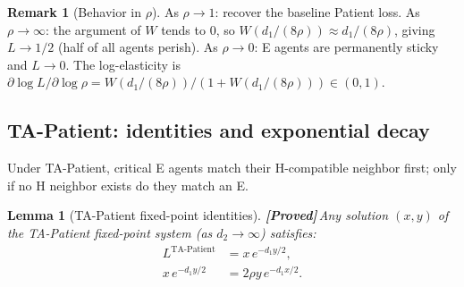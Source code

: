 \documentclass{article}
\theoremstyle{plain}
\newtheorem{lemma}{Lemma}
\theoremstyle{definition}
\newtheorem{remark}{Remark}
\newcommand{\proved}{\textcolor{provedgreen}{\textbf{[Proved]}}\,}
\begin{document}
\begin{remark}[Behavior in $\rho$]
As $\rho\to 1$: recover the baseline Patient loss.
As $\rho\to\infty$: the argument of $W$ tends to 0, so
$W(d_1/(8\rho))\approx d_1/(8\rho)$, giving $L\to 1/2$ (half of all agents
perish).
As $\rho\to 0$: E agents are permanently sticky and $L\to 0$.
The log-elasticity is
$\partial\log L/\partial\log\rho = W(d_1/(8\rho))/(1+W(d_1/(8\rho)))\in(0,1)$.
\end{remark}

\subsection{TA-Patient: identities and exponential decay}
\label{sec:TAP-rho}

Under TA-Patient, critical E agents match their H-compatible neighbor first;
only if no H neighbor exists do they match an E.

\begin{lemma}[TA-Patient fixed-point identities]
\label{lem:TAP-identities-rho}
\proved Any solution $(x,y)$ of the TA-Patient fixed-point system
(as $d_2\to\infty$) satisfies:
\begin{align}
  L^{\mathrm{TA\text{-}Patient}} &= x\,e^{-d_1 y/2},
    \label{eq:TAP-loss-identity}\\
  x\,e^{-d_1 y/2} &= 2\rho y\,e^{-d_1 x/2}.
    \label{eq:TAP-cross-identity}
\end{align}
\end{lemma}
\end{document}
